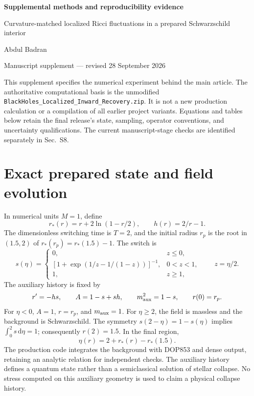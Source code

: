 \documentclass[10pt]{article}
\newcommand{\dd}{\mathrm d}
\begin{document}
\begin{center}
{\Large\bfseries Supplemental methods and reproducibility evidence}\par
\vspace{5pt}
{\large Curvature-matched localized Ricci fluctuations in a prepared Schwarzschild interior}\par
Abdul Badran\par
Manuscript supplement --- revised 28 September 2026
\end{center}

This supplement specifies the numerical experiment behind the main article. The authoritative computational basis is the unmodified \texttt{BlackHoles\_Localized\_Inward\_Recovery.zip}. It is not a new production calculation or a compilation of all earlier project variants. Equations and tables below retain the final release's state, sampling, operator conventions, and uncertainty qualifications. The current manuscript-stage checks are identified separately in Sec.~S8.

\section{Exact prepared state and field evolution}
In numerical units $M=1$, define
\begin{equation}
 r_*(r)=r+2\ln(1-r/2),\qquad h(r)=2/r-1.
\end{equation}
The dimensionless switching time is $T=2$, and the initial radius $r_p$ is the root in $(1.5,2)$ of $r_*(r_p)=r_*(1.5)-1$. The switch is
\begin{equation}
 s(\eta)=\begin{cases}0,&z\leq0,\\
 [1+\exp(1/z-1/(1-z))]^{-1},&0<z<1,\\
 1,&z\geq1,
 \end{cases}\qquad z=\eta/2.
 \label{eq:prep}
\end{equation}
The auxiliary history is fixed by
\begin{equation}
 r'=-h s,\qquad A=1-s+s h,\qquad m_{\rm aux}^2=1-s,
 \qquad r(0)=r_p.
\end{equation}
For $\eta<0$, $A=1$, $r=r_p$, and $m_{\rm aux}=1$. For $\eta\geq2$, the field is massless and the background is Schwarzschild. The symmetry $s(2-\eta)=1-s(\eta)$ implies $\int_0^2s\,\dd\eta=1$; consequently $r(2)=1.5$. In the final region,
\begin{equation}
 \eta(r)=2+r_*(r)-r_*(1.5).
\end{equation}
The production code integrates the background with DOP853 and dense output, retaining an analytic relation for independent checks. The auxiliary history defines a quantum state rather than a semiclassical solution of stellar collapse. No stress computed on this auxiliary geometry is used to claim a physical collapse history.
\end{document}
